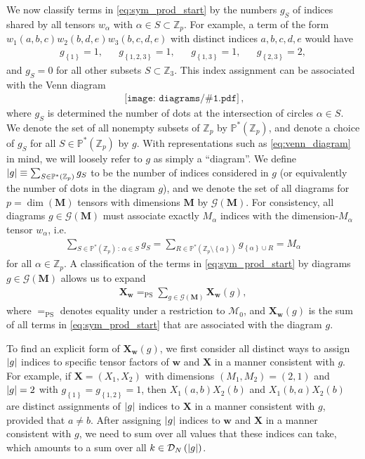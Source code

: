 \documentclass[nofootinbib,notitlepage,11pt]{revtex4-2}
\newcommand{\p}[1]{\left(#1\right)} %
\renewcommand{\set}[1]{\left\{#1\right\}} %
\newcommand{\m}{\bm} %
\newcommand{\1}{\mathds{1}}
\newcommand{\D}{\mathcal{D}}
\newcommand{\G}{\mathcal{G}}
\newcommand{\M}{\mathcal{M}}
\newcommand{\PP}{\mathbb{P}}
\newcommand{\ZZ}{\mathbb{Z}}
\newcommand{\EQPS}{=_{\text{PS}}}
\newcommand{\diagram}[1]
{\,\texttt{[image: diagrams/\#1.pdf]}\,}
\begin{document}
We now classify terms in \eqref{eq:sym_prod_start} by the numbers
$g_S$ of indices shared by all tensors $w_\alpha$ with
$\alpha\in S\subset\ZZ_p$.  For example, a term of the form
$w_1\p{a,b,c} w_2\p{b,d,e} w_3\p{b,c,d,e}$ with distinct indices
$a,b,c,d,e$ would have
\begin{align}
  g_{\set{1}} = 1,
  &&
  g_{\set{1,2,3}} = 1,
  &&
  g_{\set{1,3}} = 1,
  &&
  g_{\set{2,3}} = 2,
\end{align}
and $g_S=0$ for all other subsets $S\subset\ZZ_3$.  This index
assignment can be associated with the Venn diagram
\begin{align}
  \diagram{example_123},
  \label{eq:venn_diagram}
\end{align}
where $g_S$ is determined the number of dots at the intersection of
circles $\alpha\in S$.  We denote the set of all nonempty subsets of
$\ZZ_p$ by $\PP^*\p{\ZZ_p}$, and denote a choice of $g_S$ for all
$S\in\PP^*\p{\ZZ_p}$ by $g$.  With representations such as
\eqref{eq:venn_diagram} in mind, we will loosely refer to $g$ as
simply a ``diagram''.  We define
$\abs{g}\equiv\sum_{S\in\PP^*\p{\ZZ_p}}g_S$ to be the number of
indices considered in $g$ (or equivalently the number of dots in the
diagram $g$), and we denote the set of all diagrams for
$p=\dim\p{\m M}$ tensors with dimensions $\m M$ by $\G\p{\m M}$.  For
consistency, all diagrams $g\in\G\p{\m M}$ must associate exactly
$M_\alpha$ indices with the dimension-$M_\alpha$ tensor $w_\alpha$,
i.e.
\begin{align}
  \sum_{S\in\PP^*\p{\ZZ_p}\,:\,\alpha\in S} g_S
  = \sum_{R\in\PP^*\p{\ZZ_p\setminus\set{\alpha}}} g_{\set{\alpha}\cup R}
  = M_\alpha
\end{align}
for all $\alpha\in\ZZ_p$.  A classification of the terms in
\eqref{eq:sym_prod_start} by diagrams $g\in\G\p{\m M}$ allows us to
expand
\begin{align}
  \m X_{\m w} \EQPS \sum_{g\in\G\p{\m M}} \m X_{\m w}\p{g},
  \label{eq:sym_prod_diagrams}
\end{align}
where $\EQPS$ denotes equality under a restriction to $\M_0$, and
$\m X_{\m w}\p{g}$ is the sum of all terms in
\eqref{eq:sym_prod_start} that are associated with the diagram $g$.

To find an explicit form of $\m X_{\m w}\p{g}$, we first consider all
distinct ways to assign $\abs{g}$ indices to specific tensor factors
of $\m w$ and $\m X$ in a manner consistent with $g$.  For example, if
$\m X=\p{X_1,X_2}$ with dimensions $\p{M_1,M_2}=\p{2,1}$ and
$\abs{g}=2$ with $g_{\set{1}}=g_{\set{1,2}}=1$, then
$X_1\p{a,b} X_2\p{b}$ and $X_1\p{b,a} X_2\p{b}$ are distinct
assignments of $\abs{g}$ indices to $\m X$ in a manner consistent with
$g$, provided that $a\ne b$.  After assigning $\abs{g}$ indices to
$\m w$ and $\m X$ in a manner consistent with $g$, we need to sum over
all values that these indices can take, which amounts to a sum over
all $k\in\D_N\p{\abs{g}}$.
\end{document}
